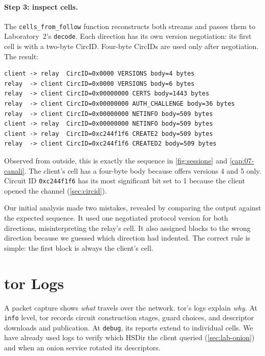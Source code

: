 \paragraph{Step 3: inspect cells.} The \texttt{cells\_from\_follow} function reconstructs both streams and passes them to Laboratory~2's \texttt{decode}. Each direction has its own version negotiation: its first cell is  with a two-byte CircID. Four-byte CircIDs are used only after negotiation. The result:
\begin{lstlisting}[numbers=none]
client -> relay  CircID=0x0000 VERSIONS body=4 bytes
relay  -> client CircID=0x0000 VERSIONS body=6 bytes
relay  -> client CircID=0x00000000 CERTS body=1443 bytes
relay  -> client CircID=0x00000000 AUTH_CHALLENGE body=36 bytes
relay  -> client CircID=0x00000000 NETINFO body=509 bytes
client -> relay  CircID=0x00000000 NETINFO body=509 bytes
client -> relay  CircID=0xc244f1f6 CREATE2 body=509 bytes
relay  -> client CircID=0xc244f1f6 CREATED2 body=509 bytes
\end{lstlisting}
Observed from outside, this is exactly the sequence in \cref{fig:sessione} and \cref{cap:07-canali}. The client's  cell has a four-byte body because  offers versions 4 and 5 only. Circuit ID \texttt{0xc244f1f6} has its most significant bit set to 1 because the client opened the channel (\cref{sec:circid}).

\begin{attenzione}
Our initial analysis made two mistakes, revealed by comparing the output against the expected sequence. It used one negotiated protocol version for both directions, misinterpreting the relay's  cell. It also assigned blocks to the wrong direction because we guessed which direction  had indented. The correct rule is simple: the first block is always the client's  cell.
\end{attenzione}

\section{tor Logs}\label{sec:traffico-log}

A packet capture shows \emph{what} travels over the network. tor's logs explain \emph{why}. At \texttt{info} level, tor records circuit construction stages, guard choices, and descriptor downloads and publication. At \texttt{debug}, its reports extend to individual cells. We have already used logs to verify which HSDir the client queried (\cref{sec:lab-onion}) and when an onion service rotated its descriptors.

